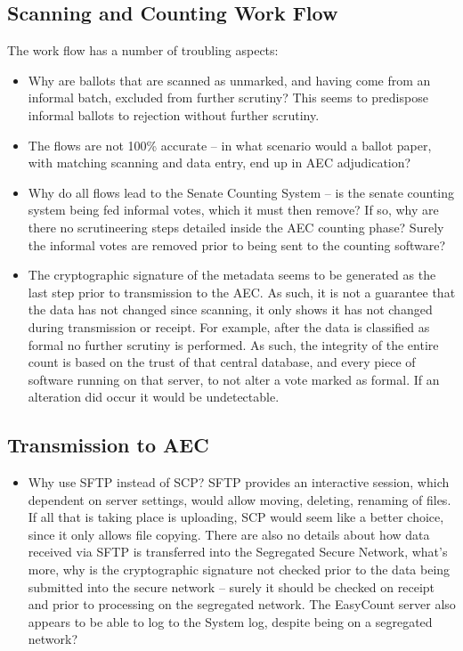 \documentclass[10pt,a4paper]{article}
\begin{document}
\subsection{Scanning and Counting Work Flow}
The work flow has a number of troubling aspects:
\begin{itemize}
\item Why are ballots that are scanned as unmarked, and having come from an informal batch, excluded from further scrutiny? This seems to predispose informal ballots to rejection without further scrutiny.
\item The flows are not 100\% accurate – in what scenario would a ballot paper, with matching scanning and data entry, end up in AEC adjudication? 
\item Why do all flows lead to the Senate Counting System – is the senate counting system being fed informal votes, which it must then remove? If so, why are there no scrutineering steps detailed inside the AEC counting phase? Surely the informal votes are removed prior to being sent to the counting software?
\item The cryptographic signature of the metadata seems to be generated as the last step prior to transmission to the AEC. As such, it is not a guarantee that the data has not changed since scanning, it only shows it has not changed during transmission or receipt. For example, after the data is classified as formal no further scrutiny is performed. As such, the integrity of the entire count is based on the trust of that central database, and every piece of software running on that server, to not alter a vote marked as formal. If an alteration did occur it would be undetectable. 
\end{itemize}

\subsection{Transmission to AEC}
\begin{itemize}
\item Why use SFTP instead of SCP? SFTP provides an interactive session, which dependent on server settings, would allow moving, deleting, renaming of files. If all that is taking place is uploading, SCP would seem like a better choice, since it only allows file copying. There are also no details about how data received via SFTP is transferred into the Segregated Secure Network, what’s more, why is the cryptographic signature not checked prior to the data being submitted into the secure network – surely it should be checked on receipt and prior to processing on the segregated network. The EasyCount server also appears to be able to log to the System log, despite being on a segregated network?
\end{itemize}
\end{document}
